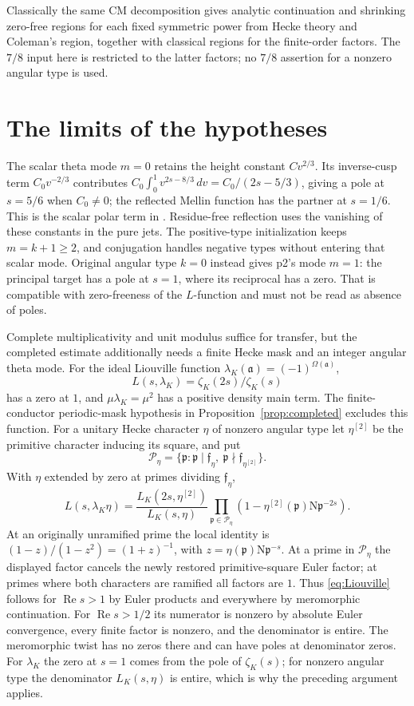 \documentclass[11pt,a4paper]{article}
\numberwithin{equation}{section}
\theoremstyle{definition}
\theoremstyle{remark}
\newcommand{\N}{\mathrm N}
\newcommand{\Rea}{\operatorname{Re}}
\begin{document}
Classically the same CM decomposition gives analytic continuation and shrinking zero-free regions for each fixed symmetric power from Hecke theory and Coleman's region, together with classical regions for the finite-order factors. The $7/8$ input here is restricted to the latter factors; no $7/8$ assertion for a nonzero angular type is used.

\section{The limits of the hypotheses}\label{sec:limits}
The scalar theta mode $m=0$ retains the height constant $Cv^{2/3}$. Its inverse-cusp term $C_0v^{-2/3}$ contributes $C_0\int_0^1v^{2s-8/3}\,dv=C_0/(2s-5/3)$, giving a pole at $s=5/6$ when $C_0\ne0$; the reflected Mellin function has the partner at $s=1/6$. This is the scalar polar term in \cite[Proposition 5.1]{DR}. Residue-free reflection uses the vanishing of these constants in the pure jets. The positive-type initialization keeps $m=k+1\ge2$, and conjugation handles negative types without entering that scalar mode. Original angular type $k=0$ instead gives p2's mode $m=1$: the principal target has a pole at $s=1$, where its reciprocal has a zero. That is compatible with zero-freeness of the $L$-function and must not be read as absence of poles.

Complete multiplicativity and unit modulus suffice for transfer, but the completed estimate additionally needs a finite Hecke mask and an integer angular theta mode. For the ideal Liouville function $\lambda_K(\mathfrak a)=(-1)^{\Omega(\mathfrak a)}$,
\[
 L(s,\lambda_K)=\zeta_K(2s)/\zeta_K(s)
\]
has a zero at $1$, and $\mu\lambda_K=\mu^2$ has a positive density main term. The finite-conductor periodic-mask hypothesis in Proposition~\ref{prop:completed} excludes this function. For a unitary Hecke character $\eta$ of nonzero angular type let $\eta^{[2]}$ be the primitive character inducing its square, and put
\[
 \mathcal P_\eta=\{\mathfrak p:\mathfrak p\mid\mathfrak f_\eta,\ 
                      \mathfrak p\nmid\mathfrak f_{\eta^{[2]}}\}.
\]
With $\eta$ extended by zero at primes dividing $\mathfrak f_\eta$,
\begin{equation}\label{eq:Liouville}
 L(s,\lambda_K\eta)=
 \frac{L_K(2s,\eta^{[2]})}{L_K(s,\eta)}
 \prod_{\mathfrak p\in\mathcal P_\eta}
 (1-\eta^{[2]}(\mathfrak p)\N\mathfrak p^{-2s}).
\end{equation}
At an originally unramified prime the local identity is
$(1-z)/(1-z^2)=(1+z)^{-1}$, with
$z=\eta(\mathfrak p)\N\mathfrak p^{-s}$.
At a prime in $\mathcal P_\eta$ the displayed factor cancels the newly restored primitive-square Euler factor; at primes where both characters are ramified all factors are $1$.
Thus \eqref{eq:Liouville} follows for $\Rea s>1$ by Euler products and everywhere by meromorphic continuation.
For $\Rea s>1/2$ its numerator is nonzero by absolute Euler convergence, every finite factor is nonzero, and the denominator is entire. The meromorphic twist has no zeros there and can have poles at denominator zeros.
For $\lambda_K$ the zero at $s=1$ comes from the pole of $\zeta_K(s)$; for nonzero angular type the denominator $L_K(s,\eta)$ is entire, which is why the preceding argument applies.
\end{document}
